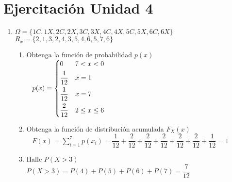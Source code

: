 \documentclass[12pt,letterpaper,fleqn]{article}
\begin{document}
    \section*{Ejercitación Unidad 4}

    \begin{enumerate}[label=\textbf{\arabic*.}]

        \item %
            $\Omega = \{1C,1X,2C,2X,3C,3X,4C,4X,5C,5X,6C,6X \}$\\
            $R_x = \{ 2 ,1 ,3 ,2, 4, 3, 5, 4, 6, 5, 7, 6 \}$
            \begin{enumerate}[label=\textbf{\alph*.}]
                \item Obtenga la función de probabilidad $ p(x) $ \\ %
                $
                     p(x)=
                        \begin{dcases}
                          0 & 7<x<0 \\
                          \frac{1}{12} & x=1\\
                          \frac{1}{12} & x=7 \\
                          \frac{2}{12} & 2\leq x \leq 6
                      \end{dcases}
                $ \\
                \item Obtenga la función de distribución acumulada $F_X(x)$ \\ %
                    $ F(x) = $$\sum_{i=1}^{7} p(x_i) = \dfrac{1}{12} + \dfrac{2}{12} + \dfrac{2}{12} +\dfrac{2}{12}+\dfrac{2}{12}+\dfrac{2}{12}+\dfrac{1}{12}  = 1$$ $ \\

                \item Halle $P(X>3)$ \\%
                    $ P(X>3) = P(4)+P(5)+P(6)+P(7) = \boxed{\dfrac{7}{12}} $ \\


\end{enumerate}
\end{enumerate}
\end{document}
